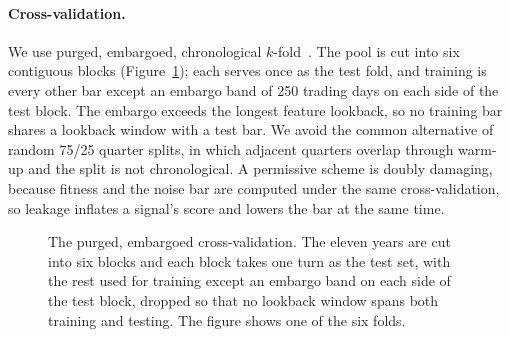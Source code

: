 \documentclass[11pt]{article}
\begin{document}
\paragraph{Cross-validation.} We use purged, embargoed, chronological $k$-fold~\cite{deprado}. The
pool is cut into six contiguous blocks (Figure~\ref{fig:cv}); each serves once as the test fold, and training is every
other bar except an embargo band of 250 trading days on each side of the test block. The embargo
exceeds the longest feature lookback, so no training bar shares a lookback window with a test bar. We
avoid the common alternative of random 75/25 quarter splits, in which adjacent quarters overlap
through warm-up and the split is not chronological. A permissive scheme is doubly damaging, because
fitness and the noise bar are computed under the same cross-validation, so leakage inflates a
signal's score and lowers the bar at the same time.

\begin{figure}[htbp]
\centering
{}
\caption{The purged, embargoed cross-validation. The eleven years are cut into six blocks and each block
takes one turn as the test set, with the rest used for training except an embargo band on each side of
the test block, dropped so that no lookback window spans both training and testing. The figure shows one
of the six folds.}
\label{fig:cv}
\end{figure}
\end{document}
